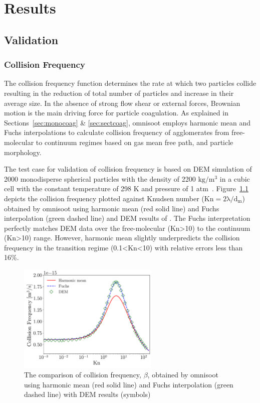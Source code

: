 \chapter{Results}

\section{Validation}

\subsection{Collision Frequency}
The collision frequency function determines the rate at which two particles collide resulting in the reduction of total number of particles and increase in their average size. In the absence of strong flow shear or external forces, Brownian motion is the main driving force for particle coagulation. As explained in Sections~\ref{sec:monocoag} \& \ref{sec:sectcoag}, omnisoot employs harmonic mean and Fuchs interpolations to calculate collision frequency of agglomerates from free-molecular to continuum regimes based on gas mean free path, and particle morphology. 

The test case for validation of collision frequency is based on DEM simulation of 2000 monodisperse spherical particles with the density of 2200 $\mathrm{kg/m^3}$ in
a cubic cell with the constant temperature of 298 K and pressure of 1 atm~\citep{goudeli2015coagulation}. Figure~\ref{fig:kernelvalid} depicts the collision frequency plotted against Knudsen number ($\mathrm{Kn=2\lambda/d_m}$) obtained by omnisoot using harmonic mean (red solid line) and Fuchs interpolation (green dashed line) and DEM results of \citet{goudeli2015coagulation}. The Fuchs interpretation perfectly matches DEM data over the free-molecular (Kn>10) to the continuum (Kn>10) range. However, harmonic mean slightly underpredicts the collision frequency in the transition regime (0.1<Kn<10) with relative errors less than 16\%. 
\begin{figure}[!htbp]
	\centering
	\includegraphics[width=0.6\textwidth]{Figures/Results/Validation/Kernel/kernel_valid.pdf}
	\caption{The comparison of collision frequency, $\beta$, obtained by omnisoot using harmonic mean (red solid line) and Fuchs interpolation (green dashed line) with DEM results (symbols)~\citep{goudeli2015coagulation}}
	\label{fig:kernelvalid}
\end{figure} 


